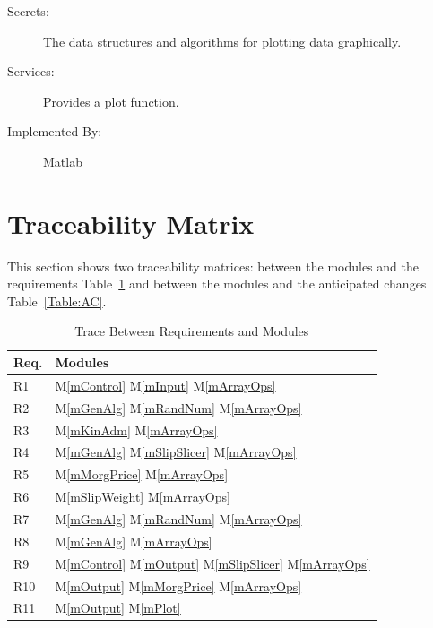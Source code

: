 \documentclass[12pt, titlepage]{article}
\newcommand{\mref}[1]{M\ref{#1}}
\begin{document}
\begin{description}
\item[Secrets:] The data structures and algorithms for plotting data
  graphically.
\item[Services:] Provides a plot function.
\item[Implemented By:] Matlab
\end{description}

\section{Traceability Matrix} \label{SecTM}

\hspace{3ex}This section shows two traceability matrices: between the
modules and the requirements Table~\ref{Table:Req} and between the
modules and the anticipated changes Table~\ref{Table:AC}.

\begin{table}[h!]
\centering
\begin{tabular}{ll}
\toprule
\textbf{Req.} & \textbf{Modules}\\
\midrule
R1 & \mref{mControl} \mref{mInput} \mref{mArrayOps}\\
R2 & \mref{mGenAlg} \mref{mRandNum} \mref{mArrayOps}\\
R3 & \mref{mKinAdm} \mref{mArrayOps}\\
R4 & \mref{mGenAlg} \mref{mSlipSlicer} \mref{mArrayOps}\\
R5 & \mref{mMorgPrice} \mref{mArrayOps}\\
R6 & \mref{mSlipWeight} \mref{mArrayOps}\\
R7 & \mref{mGenAlg} \mref{mRandNum} \mref{mArrayOps}\\
R8 & \mref{mGenAlg} \mref{mArrayOps}\\
R9 & \mref{mControl} \mref{mOutput} \mref{mSlipSlicer} \mref{mArrayOps}\\
R10 & \mref{mOutput} \mref{mMorgPrice} \mref{mArrayOps}\\
R11 & \mref{mOutput} \mref{mPlot}\\
\bottomrule
\end{tabular}
\caption{Trace Between Requirements and Modules}
\label{Table:Req}
\end{table}
\end{document}
